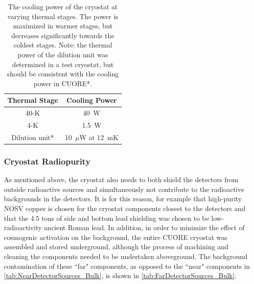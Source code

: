 \begin{table}[htbp]
    \centering
    \begin{tabular}{c|c}
    \hline
    \hline
    Thermal Stage     & Cooling Power \\
    \hline
    40-K     & 40~W \\
    4-K      & 1.5~W \\
    Dilution unit*    & 10~$\mu$W at 12~mK \\
    \hline
    \hline
    \end{tabular}
    \caption[The cooling power of the cryostat at varying thermal stages.]
    {The cooling power of the cryostat at varying thermal stages.
    The power is maximized in warmer stages, but decreases significantly towards the coldest stages.
    Note: the thermal power of the dilution unit was determined in a test cryostat, but should be consistent with the cooling power in CUORE*.}
    \label{tab:cryostat_cooling_power}
\end{table}
\subsubsection*{Cryostat Radiopurity}
As mentioned above, the cryostat also needs to both shield the detectors from outside radioactive sources and simultaneously not contribute to the radioactive backgrounds in the detectors.
It is for this reason, for example that high-purity NOSV copper is chosen for the cryostat components closest to the detectors and that the 4.5 tons of side and bottom lead shielding was chosen to be low-radioactivity ancient Roman lead.
In addition, in order to minimize the effect of cosmogenic activation on the background, the entire CUORE cryostat was assembled and stored underground, although the process of machining and cleaning the components needed to be undertaken aboveground.
The background contamination of these ``far" components, as opposed to the ``near" components in \autoref{tab:NearDetectorSources_Bulk}, is shown in \autoref{tab:FarDetectorSources_Bulk}. 

